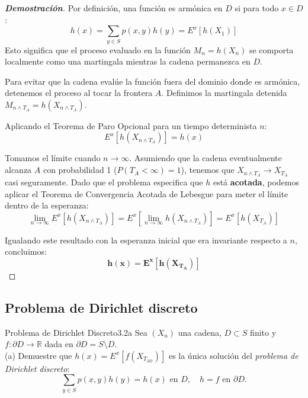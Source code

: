 \documentclass[10pt,a4paper]{article}
\begin{document}
\begin{proof}[\textbf{Demostración}]
    Por definición, una función es armónica en $D$ si para todo $x \in D$:
    \[ h(x) = \sum_{y \in S} p(x,y)h(y) = E^x[h(X_1)] \]
    Esto significa que el proceso evaluado en la función $M_n = h(X_n)$ se comporta localmente como una martingala mientras la cadena permanezca en $D$.
    
    Para evitar que la cadena evalúe la función fuera del dominio donde es armónica, detenemos el proceso al tocar la frontera $A$. Definimos la martingala detenida $M_{n \wedge T_A} = h(X_{n \wedge T_A})$.
    
    Aplicando el Teorema de Paro Opcional para un tiempo determinista $n$:
    \[ E^x[h(X_{n \wedge T_A})] = h(x) \]
    
    Tomamos el límite cuando $n \to \infty$. Asumiendo que la cadena eventualmente alcanza $A$ con probabilidad 1 ($P(T_A < \infty) = 1$), tenemos que $X_{n \wedge T_A} \to X_{T_A}$ casi seguramente. 
    Dado que el problema especifica que $h$ está \textbf{acotada}, podemos aplicar el Teorema de Convergencia Acotada de Lebesgue para meter el límite dentro de la esperanza:
    \[ \lim_{n \to \infty} E^x[h(X_{n \wedge T_A})] = E^x\left[ \lim_{n \to \infty} h(X_{n \wedge T_A}) \right] = E^x[h(X_{T_A})] \]
    
    Igualando este resultado con la esperanza inicial que era invariante respecto a $n$, concluimos:
    \[ \mathbf{h(x) = E^x[h(X_{T_A})]} \]
   
\end{proof}


\newpage

\subsection{Problema de Dirichlet discreto}

\begin{ejercicio}{Problema de Dirichlet Discreto}{3.2a}
    Sea $(X_n)$ una cadena, $D \subset S$ finito y $f : \partial D \to \mathbb{R}$ dada en $\partial D = S \setminus D$. \\
    (a) Demuestre que $h(x) = E^x[f(X_{T_{\partial D}})]$ es la única solución del \textit{problema de Dirichlet discreto}: 
    \[ \sum_{y \in S} p(x,y) h(y) = h(x) \text{ en } D, \quad h = f \text{ en } \partial D. \]
\end{ejercicio}

\vspace{2mm}
\end{document}
